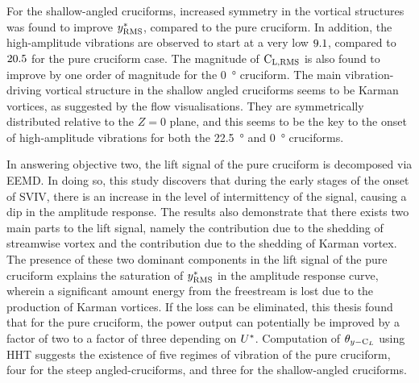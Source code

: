 \documentclass[oneside]{utmthesis}
\begin{document}
For the shallow-angled cruciforms, increased symmetry in the vortical structures was found to improve $y^{*}_{\text{RMS}}$, compared to the pure cruciform. In addition, the high-amplitude vibrations are observed to start at a very low $9.1$, compared to $20.5$ for the pure cruciform case. The magnitude of $\text{C}_{\text{L,RMS}}$ is also found to improve by one order of magnitude for the \SI{0}{\degree} cruciform. The main vibration-driving vortical structure in the shallow angled cruciforms seems to be Karman vortices, as suggested by the flow visualisations. They are symmetrically distributed relative to the $Z=0$ plane, and this seems to be the key to the onset of high-amplitude vibrations for both the \SI{22.5}{\degree} and \SI{0}{\degree} cruciforms.



In answering objective two, the lift signal of the pure cruciform is decomposed via EEMD. In doing so, this study discovers that during the early stages of the onset of SVIV, there is an increase in the level of intermittency of the signal, causing a dip in the amplitude response. The results also demonstrate that there exists two main parts to the lift signal, namely the contribution due to the shedding of streamwise vortex and the contribution due to the shedding of Karman vortex. The presence of these two dominant components in the lift signal of the pure cruciform explains the saturation of $y^{*}_{\text{RMS}}$ in the amplitude response curve, wherein a significant amount energy from the freestream is lost due to the production of Karman vortices. If the loss can be eliminated, this thesis found that for the pure cruciform, the power output can potentially be improved by a factor of two to a factor of three depending on $U^{*}$. Computation of $\theta_{y-\text{C}_{L}}$ using HHT suggests the existence of five regimes of vibration of the pure cruciform, four for the steep angled-cruciforms, and three for the shallow-angled cruciforms.
\end{document}
